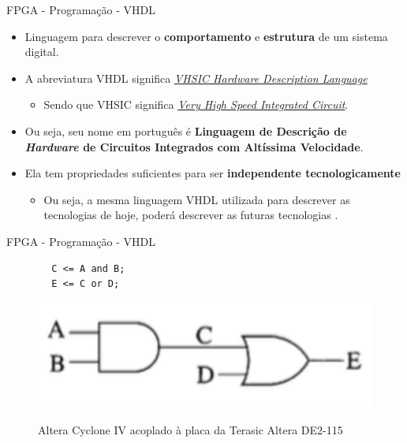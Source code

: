 	\begin{frame}{FPGA - Programação - VHDL}
		\begin{itemize}
			\setlength\itemsep{1.3em}
			\item Linguagem para descrever o \textbf{comportamento} e \textbf{estrutura} de um sistema digital.

			\item A abreviatura VHDL significa \textit{\underline{VHSIC Hardware Description Language}}
			\begin{itemize}
				\item Sendo que VHSIC significa \textit{\underline{Very High Speed Integrated Circuit}}.
			\end{itemize}

			\item Ou seja, seu nome em português é \textbf{Linguagem de Descrição de \textit{Hardware} de Circuitos Integrados com Altíssima Velocidade}.

			\item Ela tem propriedades suficientes para ser \textbf{independente tecnologicamente}
			\begin{itemize}
				\item Ou seja, a mesma linguagem VHDL utilizada para descrever as tecnologias de hoje, poderá descrever as futuras tecnologias \cite{Roth1998}.
			\end{itemize}
		\end{itemize}
	\end{frame}


	\begin{frame}[fragile]{FPGA - Programação - VHDL}
		\begin{verbatim}
		C <= A and B;
		E <= C or D;
		\end{verbatim}
		\pause
		\begin{figure}[h]
			\centering
			\caption{Altera Cyclone IV acoplado à placa da Terasic Altera DE2-115}
			\includegraphics[height=0.2\textheight]{img/fpga/vhdl.png}
			\label{fig:vhdl}
		\end{figure}
\end{frame}

